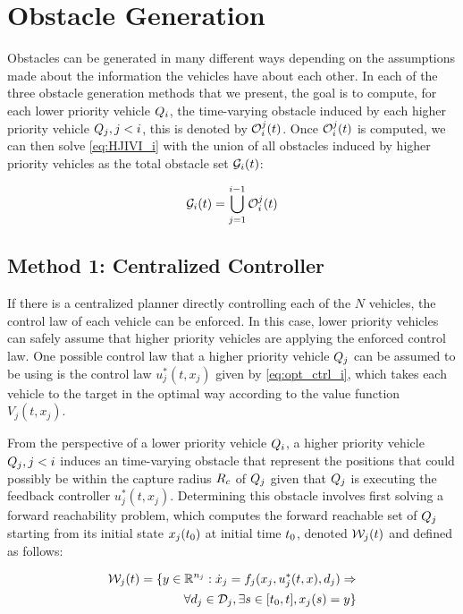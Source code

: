\section{Obstacle Generation \label{sec:obs_gen}}
Obstacles can be generated in many different ways depending on the assumptions made about the information the vehicles have about each other. In each of the three obstacle generation methods that we present, the goal is to compute, for each lower priority vehicle $Q_i$, the time-varying obstacle induced by each higher priority vehicle $Q_j, j < i$, this is denoted by $\mathcal{O}_i^j(t)$. Once $\mathcal{O}_i^j(t)$ is computed, we can then solve \eqref{eq:HJIVI_i} with the union of all obstacles induced by higher priority vehicles as the total obstacle set $\mathcal{G}_i(t)$:

\begin{equation}
\mathcal{G}_i(t) = \bigcup_{j=1}^{i-1}\mathcal{O}_i^j(t)
\end{equation}

\subsection{Method 1: Centralized Controller}
If there is a centralized planner directly controlling each of the $N$ vehicles, the control law of each vehicle can be enforced. In this case, lower priority vehicles can safely assume that higher priority vehicles are applying the enforced control law. One possible control law that a higher priority vehicle $Q_j$ can be assumed to be using is the control law $u_j^*(t, x_j)$ given by \eqref{eq:opt_ctrl_i}, which takes each vehicle to the target in the optimal way according to the value function $V_j(t, x_j)$.

From the perspective of a lower priority vehicle $Q_i$, a higher priority vehicle $Q_j, j < i$ induces an time-varying obstacle that represent the positions that could possibly be within the capture radius $R_c$ of $Q_j$ given that $Q_j$ is executing the feedback controller $u_j^*(t, x_j)$. Determining this obstacle involves first solving a forward reachability problem, which computes the forward reachable set of $Q_j$ starting from its initial state $x_j(t_0)$ at initial time $t_0$, denoted $\mathcal{W}_j(t)$ and defined as follows:

\begin{equation}
\label{eq:frs}
\begin{aligned}
\mathcal{W}_j(t) = \{y \in \mathbb{R}^{n_j}: \dot{x}_j = f_j(x_j, u_j^*(t, x), d_j) \Rightarrow \\
\forall d_j \in \mathcal{D}_j, \exists s \in [t_0, t], x_j(s) = y\}
\end{aligned}
\end{equation}

